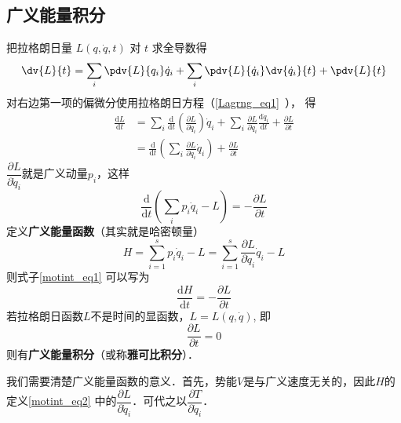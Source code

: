 \subsection{广义能量积分}

把拉格朗日量 $L(q, \dot{q}, t)$ 对 $t$ 求全导数得
\begin{equation}
\dv{L}{t} = \sum_{i} \pdv{L}{q_i} \dot{q}_i + \sum_{i} \pdv{L}{\dot{q}_i} \dv{\dot{q}_i}{t} + \pdv{L}{t}
\end{equation}
对右边第一项的偏微分使用拉格朗日方程（\autoref{Lagrng_eq1}~）， 得
\begin{equation}
\begin{aligned}
\frac{\mathrm{d} L}{\mathrm{d} t} &=\sum_{i} \frac{\mathrm{d}}{\mathrm{d} t}\left(\frac{\partial L}{\partial \dot{q}_{i}}\right) \dot{q}_{i}+\sum_{i} \frac{\partial L}{\partial \dot{q}_{i}} \frac{\mathrm{d} \dot{q}_{i}}{\mathrm{d} t} + \frac{\partial L}{\partial t} \\
&= \frac{\mathrm{d}}{\mathrm{d} t}\left(\sum_{i} \frac{\partial L}{\partial \dot{q}_{i}} \dot{q}_{i}\right) + \frac{\partial L}{\partial t}
\end{aligned}
\end{equation}
$\dfrac{\partial L}{\partial \dot{q}_{i}}$就是广义动量$p_i$，这样
\begin{equation} \label{motint_eq1}
\frac{\mathrm{d}}{\mathrm{d} t}\left(\sum_{i} p_{i} \dot{q}_{i}-L\right)=-\frac{\partial L}{\partial t}
\end{equation}
定义\textbf{广义能量函数}（其实就是哈密顿量）
\begin{equation} \label{motint_eq2}
H=\sum_{i=1}^{s} p_{i} \dot{q}_{i}-L=\sum_{i=1}^{s} \frac{\partial L}{\partial \dot{q}_{i}} \dot{q}_{i}-L
\end{equation}
则式子\autoref{motint_eq1} 可以写为
\begin{equation}
\frac{\mathrm{d} H}{\mathrm{d} t}=-\frac{\partial L}{\partial t}
\end{equation}
若拉格朗日函数$L$不是时间的显函数，$ L = L(q, \dot q)$, 即
\begin{equation}
\frac{\partial L}{\partial t}=0
\end{equation}
则有\textbf{广义能量积分}（或称\textbf{雅可比积分}）．

我们需要清楚广义能量函数的意义．首先，势能$V$是与广义速度无关的，因此$H$的定义\autoref{motint_eq2} 中的$\dfrac{\partial L}{\partial \dot q_i}$．可代之以$\dfrac{\partial T}{\partial \dot q_i}$．

